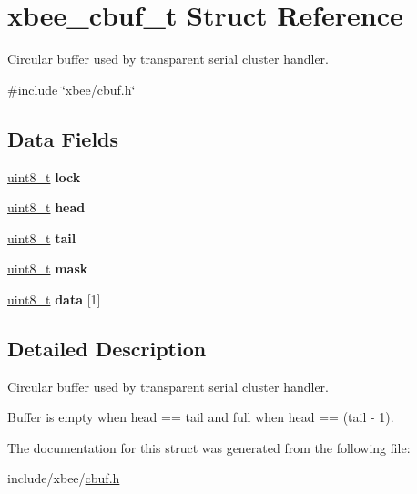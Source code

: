 \hypertarget{structxbee__cbuf__t}{}\section{xbee\+\_\+cbuf\+\_\+t Struct Reference}
\label{structxbee__cbuf__t}


Circular buffer used by transparent serial cluster handler.  




{\ttfamily \#include \char`\"{}xbee/cbuf.\+h\char`\"{}}

\subsection*{Data Fields}
\begin{DoxyCompactItemize}
\item 
\hyperlink{group__hal__dos_gae1affc9ca37cfb624959c866a73f83c2}{uint8\+\_\+t} {\bfseries lock}
\item 
\hyperlink{group__hal__dos_gae1affc9ca37cfb624959c866a73f83c2}{uint8\+\_\+t} {\bfseries head}
\item 
\hyperlink{group__hal__dos_gae1affc9ca37cfb624959c866a73f83c2}{uint8\+\_\+t} {\bfseries tail}
\item 
\hyperlink{group__hal__dos_gae1affc9ca37cfb624959c866a73f83c2}{uint8\+\_\+t} {\bfseries mask}
\item 
\hyperlink{group__hal__dos_gae1affc9ca37cfb624959c866a73f83c2}{uint8\+\_\+t} {\bfseries data} \mbox{[}1\mbox{]}
\end{DoxyCompactItemize}


\subsection{Detailed Description}
Circular buffer used by transparent serial cluster handler. 

Buffer is empty when {\ttfamily head} == {\ttfamily tail} and full when {\ttfamily head} == {\ttfamily }(tail -\/ 1). 

The documentation for this struct was generated from the following file\+:\begin{DoxyCompactItemize}
\item 
include/xbee/\hyperlink{cbuf_8h}{cbuf.\+h}\end{DoxyCompactItemize}
